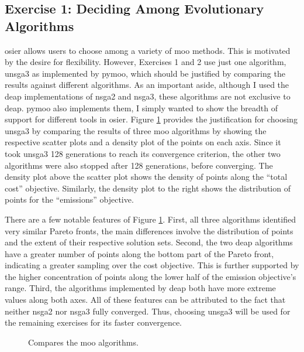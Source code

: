 \subsection{Exercise 1: Deciding Among Evolutionary Algorithms}

\ac{osier} allows users to choose among a variety of \ac{moo} methods. This is
motivated by the desire for flexibility. However, Exercises 1 and 2 use just one
algorithm, \ac{unsga3} as implemented by \ac{pymoo}, which should be justified
by comparing the results against different algorithms. As an important aside,
although I used the \ac{deap} implementations of \ac{nsga2} and \ac{nsga3},
these algorithms are not exclusive to \ac{deap}. \ac{pymoo} also implements
them, I simply wanted to show the breadth of support for different tools in
\ac{osier}. Figure \ref{fig:algorithm-comparison} provides the justification for
choosing \ac{unsga3} by comparing the results of three \ac{moo} algorithms by
showing the respective scatter plots and a density plot of the points on each
axis. Since it took \ac{unsga3} 128 generations to reach its convergence
criterion, the other two algorithms were also stopped after 128 generations,
before converging. The density plot above the scatter plot shows the density of
points along the ``total cost'' objective. Similarly, the density plot to the
right shows the distribution of points for the ``emissions'' objective.

There are a few notable features of Figure \ref{fig:algorithm-comparison}.
First, all three algorithms identified very similar Pareto fronts, the main
differences involve the distribution of points and the extent of their
respective solution sets. Second, the two \ac{deap} algorithms have a greater
number of points along the bottom part of the Pareto front, indicating a greater
sampling over the cost objective. This is further supported by the higher
concentration of points along the lower half of the emission objective's range.
Third, the algorithms implemented by \ac{deap} both have more extreme values
along both axes. All of these features can be attributed to the fact that
neither \ac{nsga2} nor \ac{nsga3} fully converged. Thus, choosing \ac{unsga3}
will be used for the remaining exercises for its faster convergence.

\begin{figure}[ht]
  \centering
  \resizebox{0.75\columnwidth}{!}{}
  \caption{Compares the \ac{moo} algorithms.}
  \label{fig:algorithm-comparison}
\end{figure}

\FloatBarrier
